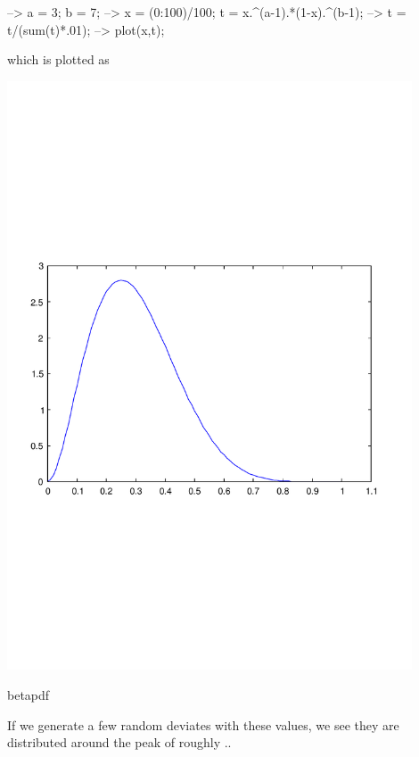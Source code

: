 \begin{DoxyVerbInclude}
--> a = 3; b = 7;
--> x = (0:100)/100; t = x.^(a-1).*(1-x).^(b-1); 
--> t = t/(sum(t)*.01);
--> plot(x,t);
\end{DoxyVerbInclude}


which is plotted as  
\begin{DoxyImage}
\includegraphics[width=12cm]{betapdf}
\caption{betapdf}
\end{DoxyImage}
 If we generate a few random deviates with these values, we see they are distributed around the peak of roughly {.}.


